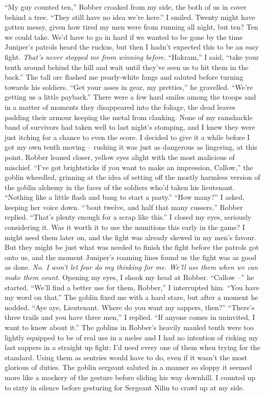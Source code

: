 \documentclass[12pt, openany]{book}
\begin{document}
“My guy counted ten,” Robber croaked from my side, the both of us in cover behind a tree. “They still have no idea we’re here.”
I smiled. Twenty might have gotten messy, given how tired my men were from running all night, but ten? Ten we could take. We’d have to go in hard if we wanted to be gone by the time Juniper’s patrols heard the ruckus, but then I hadn’t expected this to be an easy fight.\textit{ That’s never stopped me from winning before.}
“Hakram,” I said, “take your tenth around behind the hill and wait until they’ve seen us to hit them in the back.”
The tall orc flashed me pearly-white fangs and saluted before turning towards his soldiers.
“Get your asses in gear, my pretties,” he gravelled. “We’re getting us a little payback.”
There were a few hard smiles among the troops and in a matter of moments they disappeared into the foliage, the dead leaves padding their armour keeping the metal from clanking. None of my ramshackle band of survivors had taken well to last night’s stomping, and I knew they were just itching for a chance to even the score. I decided to give it a while before I got my own tenth moving – rushing it was just as dangerous as lingering, at this point. Robber leaned closer, yellow eyes alight with the most malicious of mischief.
“I’ve got brightsticks if you want to make an impression, Callow,” the goblin wheedled, grinning at the idea of setting off the mostly harmless version of the goblin alchemy in the faces of the soldiers who’d taken his lieutenant. “Nothing like a little flash and bang to start a party.”
“How many?” I asked, keeping her voice down.
“’bout twelve, and half that many cussers,” Robber replied. “That’s plenty enough for a scrap like this.”
I closed my eyes, seriously considering it. Was it worth it to use the munitions this early in the game? I might need them later on, and the fight was already skewed in my men’s favour. But they might be just what was needed to finish the fight before the patrols got onto us, and the moment Juniper’s roaming lines found us the fight was as good as done. \textit{No. I won’t let fear do my thinking for me. We’ll use them when we can make them count.} Opening my eyes, I shook my head at Robber.
“Callow –” he started.
“We’ll find a better use for them, Robber,” I interrupted him. “You have my word on that.”
The goblin fixed me with a hard stare, but after a moment he nodded.
“Aye aye, Lieutenant. Where do you want my sappers, then?”
“There’s three trails and you have three men,” I replied. “If anyone comes in uninvited, I want to know about it.”
The goblins in Robber’s heavily mauled tenth were too lightly equipped to be of real use in a melee and I had no intention of risking my last sappers in a straight up fight: I’d need every one of them when trying for the standard. Using them as sentries would have to do, even if it wasn’t the most glorious of duties. The goblin sergeant saluted in a manner so sloppy it seemed more like a mockery of the gesture before sliding his way downhill. I counted up to sixty in silence before gesturing for Sergeant Nilin to crawl up at my side.
\end{document}

